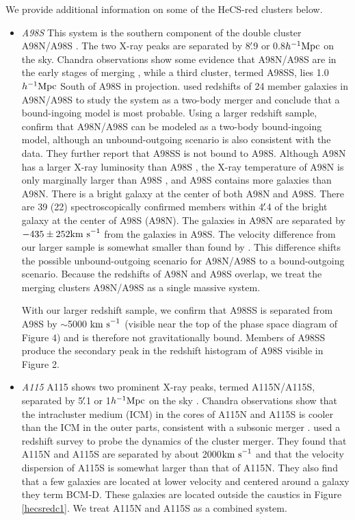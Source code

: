 We provide additional information on some of the HeCS-red clusters below.

\begin{itemize}
\item{\em A98S}  This system is the southern component of the double 
cluster A98N/A98S \citep{forman81}.  The two X-ray peaks are 
separated by 8$\hbox{$.\!\!^{\prime}$}$9 or 0.8$h^{-1}{\rm Mpc}$ on the sky.  Chandra observations show some 
evidence that A98N/A98S are in the early stages of merging \citep{paternomahler14}, while a 
third cluster, termed A98SS, lies 1.0$h^{-1}{\rm Mpc}$ South of A98S in projection.  \citet{beers82b} used redshifts 
of 24 member galaxies in A98N/A98S to study the system as a two-body merger
and conclude that a bound-ingoing model is most probable. 
Using a larger redshift sample, \citet{paternomahler14} confirm that 
A98N/A98S can be modeled as a two-body bound-ingoing 
model, although an unbound-outgoing scenario is also consistent with the data.  
They further report that A98SS is not bound to A98S.   
Although A98N has a larger X-ray luminosity than A98S \citep{forman81,jf99}, 
the X-ray temperature of A98N is only marginally larger than 
A98S \citep{paternomahler14}, and A98S contains more galaxies
than A98N. There is a bright galaxy at the center of both A98N and A98S. 
There are 39 (22) spectroscopically
confirmed members within 4$\hbox{$.\!\!^{\prime}$}$4 of the bright galaxy at the center 
of A98S (A98N). The galaxies in A98N are separated by $-435\pm 252{\rm km~s}^{-1}$ from 
the galaxies in A98S.  The velocity difference from our larger sample 
is somewhat smaller than found by \citet{paternomahler14}.  This 
difference shifts the possible unbound-outgoing scenario for A98N/A98S 
to a bound-outgoing scenario.
Because the redshifts of A98N and A98S overlap, we treat the merging 
clusters A98N/A98S as a single massive system. 

With our larger redshift sample, we confirm that A98SS is separated 
from A98S by $\sim$5000$~{\rm km~s}^{-1}$ (visible near the top of the phase space diagram 
of Figure 4) and is therefore not gravitationally bound.
Members of A98SS produce the secondary peak in the redshift histogram of 
A98S visible in Figure 2.  


\item{\em A115} A115 shows two prominent X-ray peaks, termed 
A115N/A115S, separated 
by 5$\hbox{$.\!\!^{\prime}$}$1 or 1$h^{-1}{\rm Mpc}$ on the sky \citep{forman81}.  Chandra observations 
show that the intracluster medium (ICM) in the cores of A115N and A115S is cooler than 
the ICM in the outer parts, consistent with a subsonic merger \citep{gutierrez05}.  
\citet{barrena07} used 
a redshift survey to probe the dynamics of the cluster merger.  They found that 
A115N and A115S are separated by about 2000${\rm km~s}^{-1}$ and that the velocity dispersion 
of A115S is somewhat larger than that of A115N.  They also find that a few galaxies 
are located at lower velocity and centered around a galaxy they term BCM-D. 
These galaxies are located outside the caustics in Figure \ref{hecsredc1}. 
We treat A115N and A115S as a combined system. 


\end{itemize}

